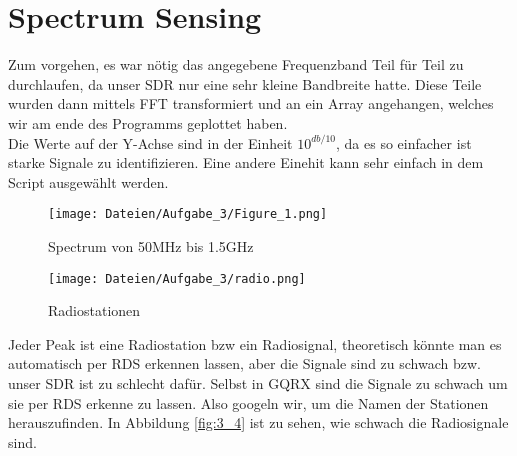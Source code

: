 \documentclass[12pt,a4paper]{article}
\begin{document}
\section{Spectrum Sensing}
Zum vorgehen, es war nötig das angegebene Frequenzband Teil für Teil zu durchlaufen, da unser SDR nur eine sehr kleine Bandbreite hatte. Diese Teile wurden dann mittels FFT transformiert und an ein Array angehangen, welches wir am ende des Programms geplottet haben.\\
Die Werte auf der Y-Achse sind in der Einheit $10^{db/10}$, da es so einfacher ist starke Signale zu identifizieren. Eine andere Einehit kann sehr einfach in dem Script ausgewählt werden.
\begin{figure}[H]
\centering
\texttt{[image: Dateien/Aufgabe\_3/Figure\_1.png]} 
\caption{Spectrum von 50MHz bis 1.5GHz}
\label{fig:3_1}
\end{figure}
\begin{figure}[H]
\centering
\texttt{[image: Dateien/Aufgabe\_3/radio.png]} 
\caption{Radiostationen}
\label{fig:3_3}
\end{figure}
Jeder Peak ist eine Radiostation bzw ein Radiosignal, theoretisch könnte man es automatisch per RDS erkennen lassen, aber die Signale sind zu schwach bzw. unser SDR ist zu schlecht dafür. Selbst in GQRX sind die Signale zu schwach um sie per RDS erkenne zu lassen. Also googeln wir, um die Namen der Stationen herauszufinden. In Abbildung \ref{fig:3_4} ist zu sehen, wie schwach die Radiosignale sind.
\end{document}

